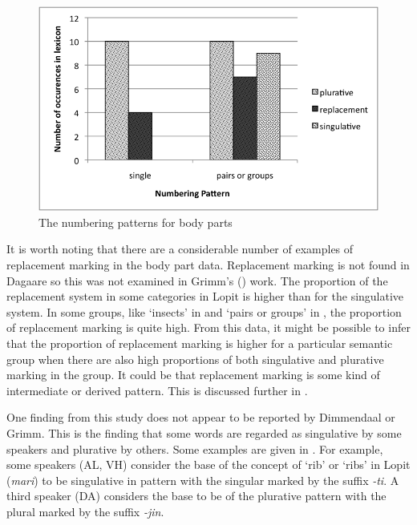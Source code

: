 \documentclass[output=paper]{langsci/langscibook}
\begin{document}
\begin{figure}
\includegraphics[width=\textwidth]{figures/moodie-fig-2.png}
\caption{The numbering patterns for body parts}
\label{fig:moodie:2}
\end{figure}

It is worth noting that there are a considerable number of examples of replacement marking in the body part data. Replacement marking is not found in Dagaare so this was not examined in Grimm’s (\citeyear{Grimm2012}) work. The proportion of the replacement system in some categories in Lopit is higher than for the singulative system.  In some groups, like ‘insects’ in  and  ‘pairs or groups’ in , the proportion of replacement marking is quite high. From this data, it might be possible to infer that the proportion of replacement marking is higher for a particular semantic group when there are also high proportions of both singulative and plurative marking in the group. It could be that replacement marking is some kind of intermediate or derived pattern.  This is discussed further in .

One finding from this study does not appear to be reported by Dimmendaal or Grimm. This is the finding that some words are regarded as singulative by some speakers and plurative by others. Some examples are given in . For example, some speakers (AL, VH) consider the base of the concept of ‘rib’ or ‘ribs’ in Lopit (\textit{mari}) to be singulative in pattern with the singular marked by the suffix \textit{-ti}. A third speaker (DA) considers the base to be of the plurative pattern with the plural marked by the suffix \textit{-jin}. 
\end{document}
